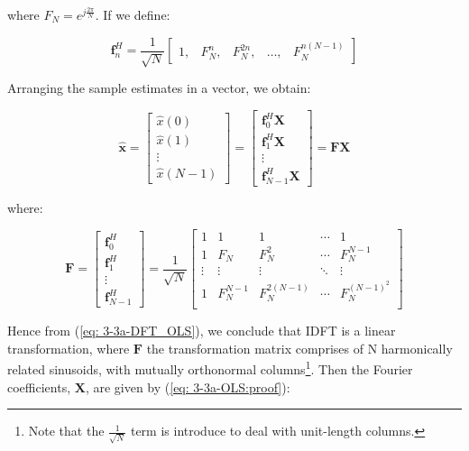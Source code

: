 \documentclass[12pt]{article}
\def\vf{{\bm{f}}}
\def\vx{{\bm{x}}}
\begin{document}
			where $F_{N} = e^{j \frac{2\pi}{N}}$. If we define:
			
			\begin{equation}
			\renewcommand\arraystretch{1.5}
			\vf_{n}^{H} = \frac{1}{\sqrt{N}}
			\begin{bmatrix}
			1, & F_{N}^{n}, & F_{N}^{2n}, & \ldots, & F_{N}^{n(N-1)}
			\end{bmatrix}
			\end{equation}
			
			Arranging the sample estimates in a vector, we obtain:
			
			\begin{equation}
			\renewcommand\arraystretch{1.5}
			\hat{\vx} =
			\begin{bmatrix}
			\hat{x}(0) \\ \hat{x}(1) \\ \vdots \\ \hat{x}(N-1)
			\end{bmatrix}
			=
			\begin{bmatrix}
			\vf_{0}^{H} \mathbf{X} \\ \vf_{1}^{H} \mathbf{X} \\ \vdots \\ \vf_{N-1}^{H} \mathbf{X}
			\end{bmatrix}
			=
			\mathbf{F} \mathbf{X}
			\label{eq:DFT_OLS}
			\end{equation}
			
			where:
			
			\begin{equation}
			\renewcommand\arraystretch{1.5}
			\mathbf{F} =
			\begin{bmatrix}
			\vf_{0}^{H} \\ \vf_{1}^{H} \\ \vdots \\ \vf_{N-1}^{H}
			\end{bmatrix}
			= \frac{1}{\sqrt{N}}
			\begin{bmatrix}
			1 & 1 & 1 & \cdots & 1 \\
			1 & F_{N} & F_{N}^{2} & \cdots & F_{N}^{N-1} \\
			\vdots & \vdots & \vdots & \ddots & \vdots \\
			1 & F_{N}^{N-1} & F_{N}^{2(N-1)} & \cdots & F_{N}^{(N-1)^{2}} \\
			\end{bmatrix}
			\end{equation}
			
			Hence from (\ref{eq: 3-3a-DFT_OLS}), we conclude that IDFT is a linear transformation, where $\mathbf{F}$ the transformation matrix comprises of N harmonically related sinusoids,
			with mutually orthonormal columns\footnote{Note that the $\frac{1}{\sqrt{N}}$ term is introduce to deal with unit-length columns.}. Then the Fourier coefficients, $\mathbf{X}$, are given by (\ref{eq: 3-3a-OLS:proof}):
			
\end{document}
